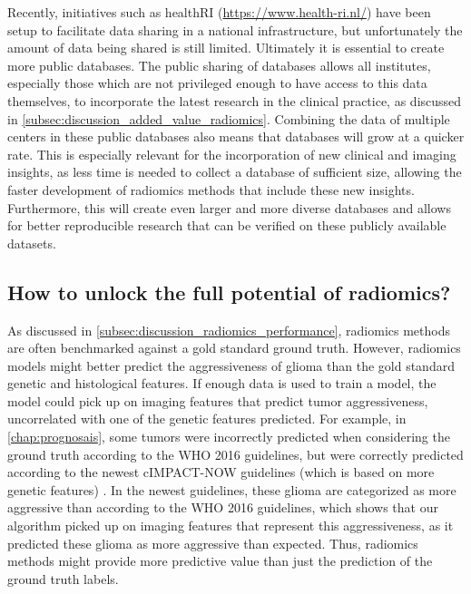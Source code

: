 Recently, initiatives such as healthRI (\url{https://www.health-ri.nl/}) have been setup to facilitate data sharing in a national infrastructure, but unfortunately the amount of data being shared is still limited.
Ultimately it is essential to create more public databases.
The public sharing of databases allows all institutes, especially those which are not privileged enough to have access to this data themselves, to incorporate the latest research in the clinical practice, as discussed in \cref{subsec:discussion_added_value_radiomics}.
Combining the data of multiple centers in these public databases also means that databases will grow at a quicker rate.
This is especially relevant for the incorporation of new clinical and imaging insights, as less time is needed to collect a database of sufficient size, allowing the faster development of radiomics methods that include these new insights.
Furthermore, this will create even larger and more diverse databases and allows for better reproducible research that can be verified on these publicly available datasets.



\subsection{How to unlock the full potential of radiomics?}

As discussed in \cref{subsec:discussion_radiomics_performance}, radiomics methods are often benchmarked against a gold standard ground truth.
However, radiomics models might better predict the aggressiveness of \gls{glioma} than the gold standard genetic and histological features.
If enough data is used to train a model, the model could pick up on imaging features that predict \gls{tumor} aggressiveness, uncorrelated with one of the genetic features predicted.
For example, in \cref{chap:prognosais}, some \glspl{tumor} were incorrectly predicted when considering the ground truth according to the \gls{WHO} 2016 guidelines, but were correctly predicted according to the newest cIMPACT-NOW guidelines (which is based on more genetic features) \autocite{lous2020impactnow}.
In the newest guidelines, these glioma are categorized as more aggressive than according to the \gls{WHO} 2016 guidelines, which shows that our algorithm picked up on imaging features that represent this aggressiveness, as it predicted these glioma as more aggressive than expected.
Thus, radiomics methods might provide more predictive value than just the prediction of the ground truth labels.

